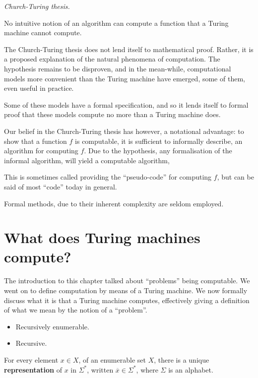 \begin{hypothesis} \textit{Church-Turing thesis.}

No intuitive notion of an algorithm can compute a function that a Turing
machine cannot compute.

\end{hypothesis}

The Church-Turing thesis does not lend itself to mathematical proof. Rather, it
is a proposed explanation of the natural phenomena of computation. The
hypothesis remains to be disproven, and in the mean-while, computational models
more convenient than the Turing machine have emerged, some of them, even useful
in practice.

Some of these models have a formal specification, and so it lends itself to
formal proof that these models compute no more than a Turing machine does.

Our belief in the Church-Turing thesis has however, a notational advantage: to
show that a function $f$ is computable, it is sufficient to informally
describe, an algorithm for computing $f$. Due to the hypothesis, any
formalisation of the informal algorithm, will yield a computable algorithm,

This is sometimes called providing the ``pseudo-code'' for computing $f$, but can be said
of most ``code'' today in general.

Formal methods, due to their inherent complexity are seldom employed.

\section{What does Turing machines compute?}

The introduction to this chapter talked about ``problems'' being computable. We
went on to define computation by means of a Turing machine. We now formally
discuss what it is that a Turing machine computes, effectively giving a
definition of what we mean by the notion of a ``problem''.

\begin{itemize}

\item Recursively enumerable.

\item Recursive.

\end{itemize}

\begin{theorem} For every element $x\in X$, of an enumerable set $X$, there is
a unique \textbf{representation} of $x$ in $\Sigma^*$, written
$\overline{x}\in\Sigma^*$, where $\Sigma$ is an alphabet. \end{theorem} 

